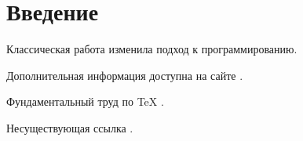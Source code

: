 \documentclass{article}
\begin{document}
\section{Введение}

Классическая работа \textcite{dijkstra1968} изменила подход к программированию.

Дополнительная информация доступна на сайте \parencite{latex-project}.

Фундаментальный труд по TeX \citep{knuth1984}.

Несуществующая ссылка \citep{nonexistent2024}.

\printbibliography
\end{document}
